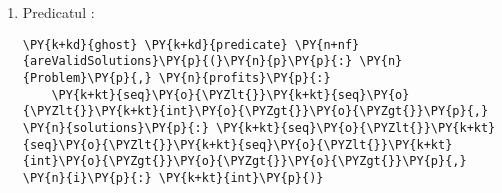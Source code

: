 \begin{sloppypar}
\begin{enumerate}
\begin{Verbatim}[commandchars=\\\{\}]
\PY{k+kd}{ghost} \PY{k+kd}{predicate} \PY{n+nf}{areValidPartialSolutions}\PY{p}{(}\PY{n}{p}\PY{p}{:} \PY{n}{Problem}\PY{p}{,} \PY{n}{profits}\PY{p}{:} 
    \PY{k+kt}{seq}\PY{o}{\PYZlt{}}\PY{k+kt}{seq}\PY{o}{\PYZlt{}}\PY{k+kt}{int}\PY{o}{\PYZgt{}}\PY{o}{\PYZgt{}}\PY{p}{,} \PY{n}{solutions}\PY{p}{:} \PY{k+kt}{seq}\PY{o}{\PYZlt{}}\PY{k+kt}{seq}\PY{o}{\PYZlt{}}\PY{k+kt}{seq}\PY{o}{\PYZlt{}}\PY{k+kt}{int}\PY{o}{\PYZgt{}}\PY{o}{\PYZgt{}}\PY{o}{\PYZgt{}}\PY{p}{,} 
    \PY{n}{partialProfits}\PY{p}{:} \PY{k+kt}{seq}\PY{o}{\PYZlt{}}\PY{k+kt}{int}\PY{o}{\PYZgt{}}\PY{p}{,} \PY{n}{partialSolutions}\PY{p}{:} \PY{k+kt}{seq}\PY{o}{\PYZlt{}}\PY{k+kt}{seq}\PY{o}{\PYZlt{}}\PY{k+kt}{int}\PY{o}{\PYZgt{}}\PY{o}{\PYZgt{}}\PY{p}{,} 
    \PY{n}{i}\PY{p}{:} \PY{k+kt}{int}\PY{p}{,} \PY{n}{j}\PY{p}{:} \PY{k+kt}{int}\PY{p}{)}    
  \PY{k}{requires} \PY{n}{isValidSubproblem}\PY{p}{(}\PY{n}{p}\PY{p}{,} \PY{n}{i}\PY{p}{,} \PY{n}{j}\PY{p}{)}
\PY{p}{\PYZob{}}
  \PY{o}{|}\PY{n}{partialSolutions}\PY{o}{|} \PY{o}{==} \PY{o}{|}\PY{n}{partialProfits}\PY{o}{|} \PY{o}{==} \PY{n}{j} \PY{o}{\PYZam{}\PYZam{}} 
  \PY{p}{(}\PY{k}{forall} \PY{n}{k} \PY{p}{::} \PY{l+m+mi}{0} \PY{o}{\PYZlt{}=} \PY{n}{k} \PY{o}{\PYZlt{}} \PY{o}{|}\PY{n}{partialSolutions}\PY{o}{|} \PY{o}{==}\PY{o}{\PYZgt{}} 
    \PY{n}{isOptimalPartialSolution}\PY{p}{(}\PY{n}{p}\PY{p}{,} \PY{n}{partialSolutions}\PY{p}{[}\PY{n}{k}\PY{p}{]}\PY{p}{,} \PY{n}{i}\PY{p}{,} \PY{n}{k}\PY{p}{)}\PY{p}{)} \PY{o}{\PYZam{}\PYZam{}} 
  \PY{p}{(}\PY{k}{forall} \PY{n}{k} \PY{p}{::} \PY{l+m+mi}{0} \PY{o}{\PYZlt{}=} \PY{n}{k} \PY{o}{\PYZlt{}} \PY{o}{|}\PY{n}{partialSolutions}\PY{o}{|} \PY{o}{==}\PY{o}{\PYZgt{}} 
    \PY{n}{gain}\PY{p}{(}\PY{n}{p}\PY{p}{,} \PY{n}{partialSolutions}\PY{p}{[}\PY{n}{k}\PY{p}{]}\PY{p}{)} \PY{o}{==} \PY{n}{partialProfits}\PY{p}{[}\PY{n}{k}\PY{p}{]}\PY{p}{)}
\PY{p}{\PYZcb{}}
\end{Verbatim}
    Este folosit pentru a valida rezultatele obținute doar pentru subproblemele pasului curent, în funcție de modificările aduse datorită creșterii numărului de obiecte disponibile.
    \item Predicatul :
    \begin{Verbatim}[commandchars=\\\{\}]
\PY{k+kd}{ghost} \PY{k+kd}{predicate} \PY{n+nf}{areValidSolutions}\PY{p}{(}\PY{n}{p}\PY{p}{:} \PY{n}{Problem}\PY{p}{,} \PY{n}{profits}\PY{p}{:} 
    \PY{k+kt}{seq}\PY{o}{\PYZlt{}}\PY{k+kt}{seq}\PY{o}{\PYZlt{}}\PY{k+kt}{int}\PY{o}{\PYZgt{}}\PY{o}{\PYZgt{}}\PY{p}{,} \PY{n}{solutions}\PY{p}{:} \PY{k+kt}{seq}\PY{o}{\PYZlt{}}\PY{k+kt}{seq}\PY{o}{\PYZlt{}}\PY{k+kt}{seq}\PY{o}{\PYZlt{}}\PY{k+kt}{int}\PY{o}{\PYZgt{}}\PY{o}{\PYZgt{}}\PY{o}{\PYZgt{}}\PY{p}{,} \PY{n}{i}\PY{p}{:} \PY{k+kt}{int}\PY{p}{)}

\end{Verbatim}
\end{enumerate}
\end{sloppypar}
